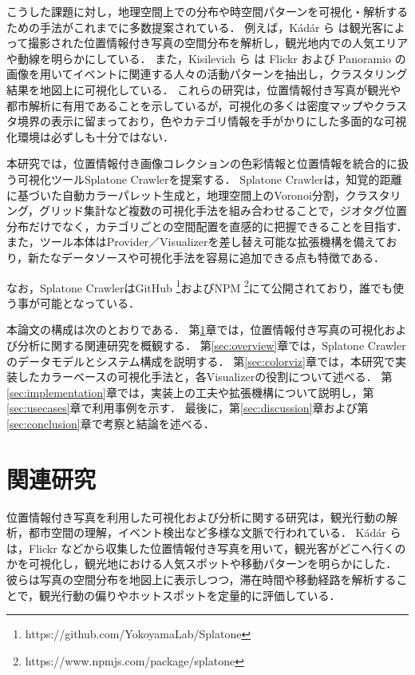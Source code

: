 こうした課題に対し，地理空間上での分布や時空間パターンを可視化・解析するための手法がこれまでに多数提案されている．
例えば，K{\'a}d{\'a}r ら\cite{kadar2013wheredotouristsgo} は観光客によって撮影された位置情報付き写真の空間分布を解析し，観光地内での人気エリアや動線を明らかにしている．
また，Kisilevich ら\cite{kisilevich2010eventbased} は Flickr および Panoramio の画像を用いてイベントに関連する人々の活動パターンを抽出し，クラスタリング結果を地図上に可視化している．
これらの研究は，位置情報付き写真が観光や都市解析に有用であることを示しているが，可視化の多くは密度マップやクラスタ境界の表示に留まっており，色やカテゴリ情報を手がかりにした多面的な可視化環境は必ずしも十分ではない．

本研究では，位置情報付き画像コレクションの色彩情報と位置情報を統合的に扱う可視化ツールSplatone Crawlerを提案する．
Splatone Crawlerは，知覚的距離に基づいた自動カラーパレット生成と，地理空間上のVoronoi分割，クラスタリング，グリッド集計など複数の可視化手法を組み合わせることで，ジオタグ位置分布だけでなく，カテゴリごとの空間配置を直感的に把握できることを目指す．
また，ツール本体はProvider／Visualizerを差し替え可能な拡張機構を備えており，新たなデータソースや可視化手法を容易に追加できる点も特徴である．

なお，Splatone CrawlerはGitHub \footnote{https://github.com/YokoyamaLab/Splatone}およびNPM \footnote{https://www.npmjs.com/package/splatone}にて公開されており，誰でも使う事が可能となっている．

本論文の構成は次のとおりである．
第\ref{sec:related}章では，位置情報付き写真の可視化および分析に関する関連研究を概観する．
第\ref{sec:overview}章では，Splatone Crawlerのデータモデルとシステム構成を説明する．
第\ref{sec:colorviz}章では，本研究で実装したカラーベースの可視化手法と，各Visualizerの役割について述べる．
第\ref{sec:implementation}章では，実装上の工夫や拡張機構について説明し，第\ref{sec:usecases}章で利用事例を示す．
最後に，第\ref{sec:discussion}章および第\ref{sec:conclusion}章で考察と結論を述べる．

\section{関連研究}
\label{sec:related}
位置情報付き写真を利用した可視化および分析に関する研究は，観光行動の解析，都市空間の理解，イベント検出など多様な文脈で行われている．
K{\'a}d{\'a}r ら\cite{kadar2013wheredotouristsgo} は，Flickr などから収集した位置情報付き写真を用いて，観光客がどこへ行くのかを可視化し，観光地における人気スポットや移動パターンを明らかにした．
彼らは写真の空間分布を地図上に表示しつつ，滞在時間や移動経路を解析することで，観光行動の偏りやホットスポットを定量的に評価している．

